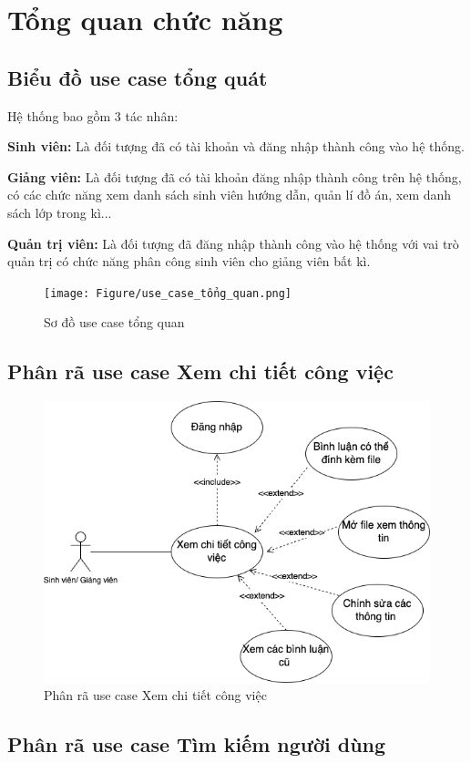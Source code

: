 \documentclass[../Main.tex]{subfiles}
\begin{document}
\section{Tổng quan chức năng}
\subsection{Biểu đồ use case tổng quát}
Hệ thống bao gồm 3 tác nhân:

\textbf{Sinh viên:} Là đối tượng đã có tài khoản và đăng nhập thành công vào hệ thống.

\textbf{Giảng viên:} Là đối tượng đã có tài khoản đăng nhập thành công trên hệ thống, có các chức năng xem danh sách sinh viên hướng dẫn, quản lí đồ án, xem danh sách lớp trong kì...

\textbf{Quản trị viên:} Là đối tượng đã đăng nhập thành công vào hệ thống với vai trò quản trị có chức năng phân công sinh viên cho giảng viên bất kì.

\begin{figure}[H]
    \centering
    \texttt{[image: Figure/use\_case\_tổng\_quan.png]}
    \caption{Sơ đồ use case tổng quan}
    \label{fig:use_case_tổng_quan}
\end{figure}
\newpage
\subsection{Phân rã use case Xem chi tiết công việc}
\begin{figure}[H]
    \centering
    \includegraphics[width=0.85\linewidth]{Figure/use_case_chi_tiet_cv (1).png}
    \caption{Phân rã use case Xem chi tiết công việc}
   \label{fig:use_case_tim_kiem}
\end{figure}

\subsection{Phân rã use case Tìm kiếm người dùng}
\end{document}
